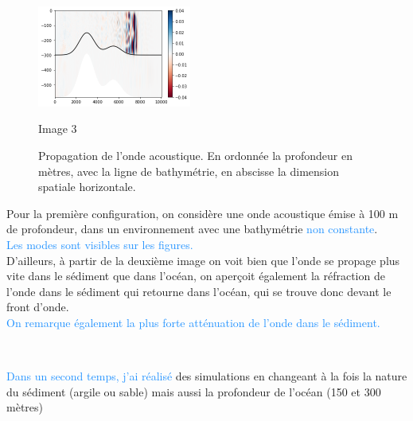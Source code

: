 \documentclass{rapportECC}
\newcommand{\FAadd}[1]{\textcolor{DodgerBlue}{{#1}}}                     %
\begin{document}
\begin{figure}[H]
    \begin{minipage}{0.9\textwidth}
        \centering
        \includegraphics[width=0.45\textwidth]{images/im6.png}
        \caption{Image 3}
        \label{fig:image3}
    \end{minipage}
    \caption{Propagation de l'onde acoustique. En ordonnée la profondeur en mètres, avec la ligne de bathymétrie, en abscisse la dimension spatiale horizontale.}
    \label{fig:three_images}
\end{figure}
Pour la première configuration, on considère une onde acoustique émise à 100 m de profondeur, dans un environnement avec une bathymétrie \FAadd{non constante}. \\
\FAadd{Les modes sont visibles sur les figures.} \\
D'ailleurs, à  partir de la deuxième image on voit bien que l'onde se propage plus vite dans le sédiment que dans l'océan, on aperçoit également la réfraction de l'onde dans le sédiment qui retourne dans l'océan, qui se trouve donc devant le front d'onde.\\
\FAadd{On remarque également la plus forte atténuation de l'onde dans le sédiment.}

\\
\vspace{1 cm}

\FAadd{Dans un second temps, j'ai réalisé} des simulations en changeant à la fois la nature du sédiment (argile ou sable) mais aussi la profondeur de l'océan (150 et 300 mètres)
\end{document}
